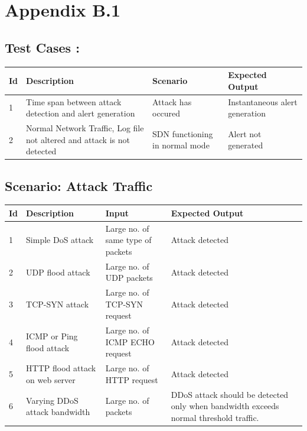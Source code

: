 \documentclass[12pt,a4paper,final]{report}
\DeclareRobustCommand{\gobblefive}[5]{}
\newcommand*{\SkipTocEntry}{\addtocontents{toc}{\gobblefive}}
\begin{document}
{{{{\SkipTocEntry\section{Appendix B.1}
\SkipTocEntry\subsection{Test Cases :}
\begin{center}
\begin{tabular}{|p{1cm}|p{3cm}|p{3cm}|p{3.5cm}|}
\hline 
 \textbf{Id} & \textbf{Description} & \textbf{Scenario} & \textbf{Expected Output} \\ 
\hline 
 1 & Time span between attack detection and alert generation & Attack has occured & Instantaneous alert generation\\
 \hline
 2 & Normal Network Traffic, Log file not altered and attack is not detected & SDN functioning in normal mode & Alert not generated\\ 
\hline 
\end{tabular} 
\end{center}

\SkipTocEntry\subsection{Scenario: Attack Traffic}
\begin{center}
\begin{tabular}{|p{1cm}|p{3cm}|p{3cm}|p{3.5cm}|}
\hline 
 \textbf{Id} & \textbf{Description} & \textbf{Input} & \textbf{Expected Output} \\ 
\hline 
 1 & Simple DoS attack & Large no. of same type of packets & Attack detected\\
 \hline
 2 & UDP flood attack & Large no. of UDP packets & Attack detected\\ 
 \hline
 3 & TCP-SYN attack & Large no. of TCP-SYN request & Attack detected\\
 \hline
 4 & ICMP or Ping flood attack & Large no. of ICMP ECHO request & Attack detected\\
 \hline
 5 & HTTP flood attack on web server & Large no. of HTTP request & Attack detected\\
 \hline
 6 & Varying DDoS attack bandwidth & Large no. of packets & DDoS attack should be detected only when bandwidth exceeds normal threshold traffic. \\
\hline 
\end{tabular} 
\end{center}

}}}}
\end{document}
